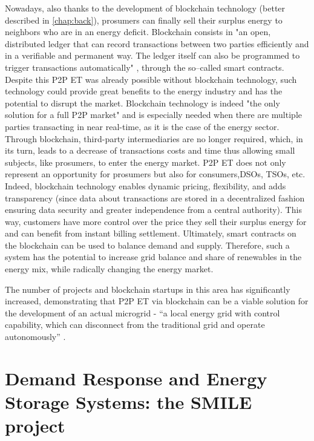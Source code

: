 Nowadays, also thanks to the development of blockchain technology (better described in \cref{chap:back}), prosumers can finally sell their surplus energy to neighbors who are in an energy deficit. Blockchain consists in "an open, distributed ledger that can record transactions between two parties efficiently and in a verifiable and permanent way. The ledger itself can also be programmed to trigger transactions automatically" \cite{TruthBlockchain}, through the so--called smart contracts. Despite this \ac{P2P} \ac{ET} was already possible without blockchain technology, such technology could provide great benefits to the energy industry and has the potential to disrupt the market. Blockchain technology is indeed "the only solution for a full \ac{P2P} market" \cite{Powerledger} and is especially needed when there are multiple parties transacting in near real-time, as it is the case of the energy sector. Through blockchain, third-party intermediaries are no longer required, which, in its turn, leads to a decrease of transactions costs and time thus allowing small subjects, like prosumers, to enter the energy market.
\ac{P2P} \ac{ET} does not only represent an opportunity for prosumers but also for consumers,\acp{DSO}, \acp{TSO}, etc. Indeed, blockchain technology enables dynamic pricing, flexibility, and adds transparency (since data about transactions are stored in a decentralized fashion ensuring data security and greater independence from a central authority). This way, customers have more control over the price they sell their surplus energy for and can benefit from instant billing settlement. Ultimately, smart contracts on the blockchain can be used to balance demand and supply. Therefore, such a system has the potential to increase grid balance \cite{PeerToPerrEnergyTrading} and share of renewables in the energy mix, while radically changing the energy market.



The number of projects and blockchain startups in this area has significantly increased, demonstrating that \ac{P2P} \ac{ET} via blockchain can be a viable solution for the development of an actual microgrid - “a local energy grid with control capability, which can disconnect from the traditional grid and operate autonomously” \cite{HowMicrogridWorks}.


\section{Demand Response and Energy Storage Systems: the SMILE project}

